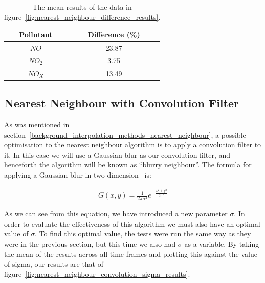			\begin{table}
				\centering
	    		\begin{tabular}{|c|c|}
	    			\hline
			        Pollutant & Difference (\%) \\ \hline
					$NO$ & 23.87 \\
					$NO_{2}$ & 3.75 \\
					$NO_{X}$ & 13.49 \\ \hline
				\end{tabular}
				\caption{The mean results of the data in figure~\ref{fig:nearest_neighbour_difference_results}.}
				\label{tab:nearest_neighbour_difference_results_mean}
			\end{table}

		\subsection{Nearest Neighbour with Convolution Filter}\label{prediction_evaluation_results_nearest_neighbour_convolution_filter}


			As was mentioned in section~\ref{background_interpolation_methods_nearest_neighbour}, a possible optimisation to the nearest neighbour algorithm is to apply a convolution filter to it. In this case we will use a Gaussian blur as our convolution filter, and henceforth the algorithm will be known as ``blurry neighbour''. The formula for applying a Gaussian blur in two dimension~\cite{gaussianblur} is:

			\begin{align*}
				G(x,y) = \frac{1}{2\pi\sigma^{2}} e^{-\frac{x^{2} + y^{2}}{2\sigma^{2}}}
			\end{align*}

			As we can see from this equation, we have introduced a new parameter $\sigma$. In order to evaluate the effectiveness of this algorithm we must also have an optimal value of $\sigma$. To find this optimal value, the tests were run the same way as they were in the previous section, but this time we also had $\sigma$ as a variable. By taking the mean of the results across all time frames and plotting this against the value of sigma, our results are that of figure~\ref{fig:nearest_neighbour_convolution_sigma_results}. 

